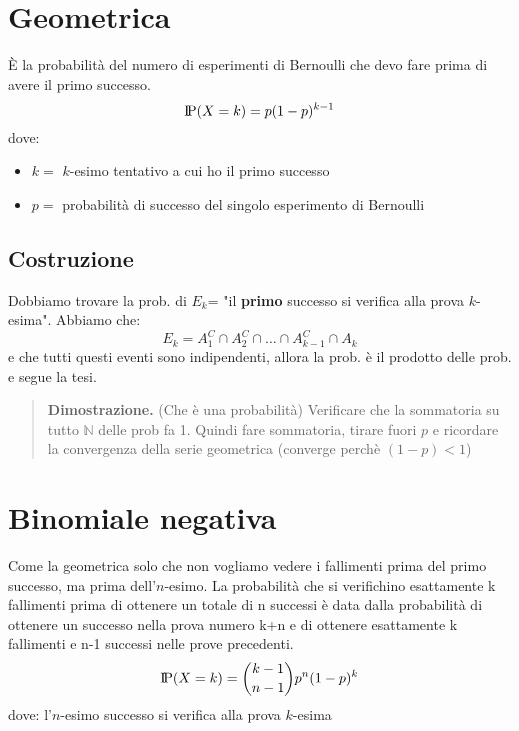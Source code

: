 \documentclass[a4paper,10pt]{article}
\newcommand{\pr}{\text{I\kern-0.15em P}} %
\theoremstyle{remark}
\theoremstyle{definition}
\newenvironment{dimo}{\begin{quote}\textbf{Dimostrazione.}}{\end{quote}} %
\begin{document}
\section{Geometrica}
È la probabilità del numero di esperimenti di Bernoulli che devo fare prima di avere il primo successo.
$$\pr(X=k)=p(1-p)^{k-1}$$
dove:
\begin{itemize}
    \item $k=$ $k$-esimo tentativo a cui ho il primo successo
    \item $p=$ probabilità di successo del singolo esperimento di Bernoulli 
\end{itemize}

\subsection*{Costruzione}
Dobbiamo trovare la prob. di  $E_k$= "il \textbf{primo} successo si verifica alla prova $k$-esima". Abbiamo che:
$$E_k=A_1^C\cap A_2^C\cap \dots \cap A_{k-1}^C\cap A_k$$
e che tutti questi eventi sono indipendenti, allora la prob. è il prodotto delle prob. e segue la tesi.

\begin{dimo}
    (Che è una probabilità) Verificare che la sommatoria su tutto $\mathbb{N}$ delle prob fa 1. Quindi fare sommatoria, tirare fuori $p$ e ricordare la convergenza della serie geometrica (converge perchè $(1-p)<1$) 
\end{dimo}

\section{Binomiale negativa}
Come la geometrica solo che non vogliamo vedere i fallimenti prima del primo successo, ma prima dell'$n$-esimo. La probabilità che si verifichino esattamente k fallimenti prima di ottenere un totale di n successi è data dalla probabilità di ottenere un successo nella prova numero k+n e di ottenere esattamente k fallimenti e n-1 successi nelle prove precedenti.
$$\pr(X=k)=\binom{k-1}{n-1}p^n(1-p)^k$$
dove: l'$n$-esimo successo si verifica alla prova $k$-esima
\end{document}
